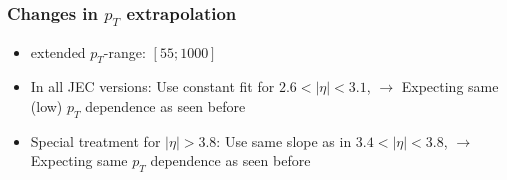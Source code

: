 \documentclass[t,compress]{beamer}
\begin{document}
\begin{frame}
  \frametitle{Changes in $p_T$ extrapolation}
  \vspace{-0.5cm}
\begin{itemize}
\item extended $p_T$-range:  $[55; 1000]$
\item In all JEC versions: Use constant fit for $2.6 < |\eta| < 3.1$, \newline \hspace{2cm} $\to$ Expecting same (low) $p_T$ dependence as seen before 
\item Special treatment for $|\eta|>3.8$: Use same slope as in $3.4 < |\eta| < 3.8$, \newline \hspace{2cm} $\to$  Expecting same $p_T$ dependence as seen before
 \end{itemize}
  \begin{figure}
\end{figure}
%  
  \end{frame}
 
\end{document}
